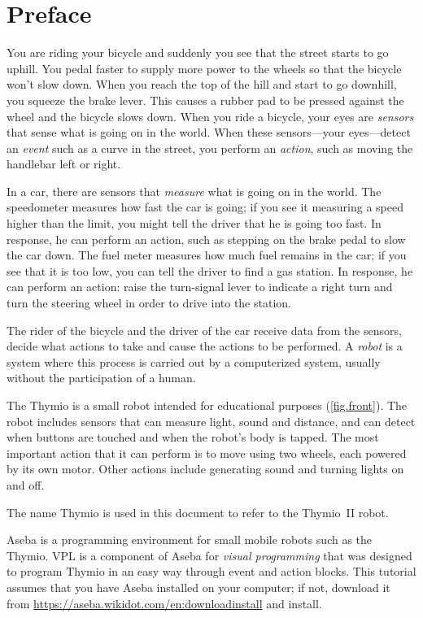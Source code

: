 \chapter*{Preface}


You are riding your bicycle and suddenly you see that the street starts
to go uphill. You pedal faster to supply more power to the wheels so
that the bicycle won't slow down. When you reach the top of the hill and
start to go downhill, you squeeze the brake lever. This causes a rubber
pad to be pressed against the wheel and the bicycle slows down. When you
ride a bicycle, your eyes are \textit{sensors} that sense what is going
on in the world. When these sensors---your eyes---detect an
\textit{event} such as a curve in the street, you perform an
\textit{action}, such as moving the handlebar left or right.

In a car, there are sensors that \textit{measure} what is going on in
the world. The speedometer measures how fast the car is going; if you
see it measuring a speed higher than the limit, you might tell the
driver that he is going too fast. In response, he can perform an action,
such as stepping on the brake pedal to slow the car down. The fuel meter
measures how much fuel remains in the car; if you see that it is too
low, you can tell the driver to find a gas station. In response, he can
perform an action: raise the turn-signal lever to indicate a right turn
and turn the steering wheel in order to drive into the station.

The rider of the bicycle and the driver of the car receive data from the
sensors, decide what actions to take and cause the actions to be
performed. A \textit{robot} is a system where this process is carried out by a
computerized system, usually without the participation of a human.


The Thymio is a small robot intended for educational purposes
(\cref{fig.front}). The robot includes sensors that can measure light,
sound and distance, and can detect when buttons are touched and when the
robot's body is tapped. The most important action that it can perform is
to move using two wheels, each powered by its own motor. Other actions
include generating sound and turning lights on and off.

The name Thymio is used in this document to refer to the Thymio~II
robot.

Aseba is a programming environment for small mobile robots such as the
Thymio. VPL is a component of Aseba for \textit{visual programming} that
was designed to program Thymio in an easy way through event and action
blocks. This tutorial assumes that you have Aseba installed on your
computer; if not, download it from 
\url{https://aseba.wikidot.com/en:downloadinstall} and install.

